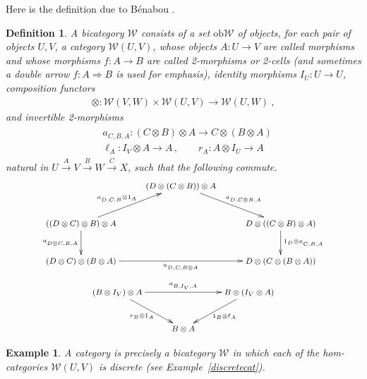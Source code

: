 \documentclass[a4paper,12pt]{article}
\newtheorem{definition}[theorem]{Definition}
\newtheorem{example}[theorem]{Example}
\theoremstyle{step}
\newcommand{\lra}{\longrightarrow}
\newcommand{\Ra}{\Rightarrow}
\newcommand{\xra}{\xrightarrow}
\def\CW{{\mathscr W}}
\begin{document}
Here is the definition due to B\'enabou \cite{Ben}.
\begin{definition} A {\em bicategory} $\CW$ consists of a set $\mathrm{ob}\CW$ of objects, for each
pair of objects $U, V$, a category $\CW(U,V)$, whose objects $A : U\to V$ are called {\em morphisms} and whose morphisms $f : A\to B$ are called {\em 2-morphisms or 2-cells} (and sometimes a double
arrow $f : A\Ra B$ is used for emphasis), 
{\em identity morphisms} $I_U : U\to U$, {\em composition functors} 
\begin{eqnarray*}
\otimes : \CW(V,W)\times \CW(U,V) \lra \CW(U,W) \ ,
\end{eqnarray*}
and invertible 2-morphisms  
\begin{eqnarray}\label{iators}
 \begin{aligned}
 & a^{}_{C,B,A} : (C \otimes B) \otimes A \lra C \otimes (B \otimes A)\\
 & \ell_A : I_V \otimes A \lra A\,, \qquad r_A : A \otimes I_U \lra A
\end{aligned}
\end{eqnarray}
natural in $U\xra{A}V\xra{B}W\xra{C}X$, such that the following commute.
\begin{eqnarray}\label{pentagon}
\begin{aligned}
\footnotesize{\xymatrix{
& (D \otimes (C \otimes B)) \otimes A \ar[rd]^-{\phantom{A}a^{}_{D,C\otimes B,A}}  & \\
((D \otimes C )\otimes B) \otimes A \ar[ru]^-{a^{}_{D,C,B}\otimes 1_{A}\phantom{D}} \ar[d]_-{a^{}_{D\otimes C,B,A}} & & D \otimes ((C \otimes B) \otimes A ) \ar[d]^-{1_{D}\otimes a^{}_{C,B,A}} \\
(D \otimes C) \otimes (B \otimes A) \ar[rr]_-{a^{}_{D,C,B\otimes A }} & & D \otimes (C \otimes (B \otimes A)) 
} }
\end{aligned}
\end{eqnarray}
\begin{eqnarray}\label{unittriangle}
\begin{aligned}
\footnotesize{\xymatrix{(B \otimes I_V)\otimes A \ar[rr]^{a^{}_{B,I_V,A}} \ar[rd]_{r_B \otimes 1_A} 
& & B \otimes (I_V \otimes A) \ar[ld]^{1_B \otimes \ell_A} \\
& B \otimes A} }
\end{aligned} 
\end{eqnarray}
\end{definition}
\begin{example} A category is precisely a bicategory $\CW$ in which each of the hom-categories $\CW(U,V)$ is discrete (see Example~\ref{discretecat}).
\end{example}
\end{document}
